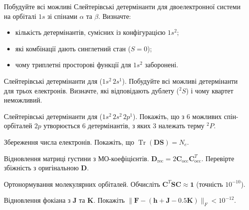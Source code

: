\begin{tasks}

    \item Побудуйте всі можливі Слейтерівські детермінанти для двоелектронної системи на орбіталі $1s$ зі спінами $\alpha$ та $\beta$.
    Визначте:
    \begin{itemize}[leftmargin=*]
        \item кількість детермінантів, сумісних із конфігурацією $1s^2$;
        \item які комбінації дають синглетний стан ($S=0$);
        \item чому триплетні просторові функції для $1s^2$ заборонені.
    \end{itemize}

    \item Слейтерівські детермінанти для  ($1s^2\,2s^1$).
    Побудуйте всі можливі детермінанти для трьох електронів.
    Визначте, які відповідають дублету ($^{2}\!S$) і чому квартет неможливий.

    \item Слейтерівські детермінанти для  ($1s^2\,2s^2\,2p^1$).
    Покажіть, що з $6$ можливих спін-орбіталей $2p$ утворюється $6$ детермінантів, з яких $3$ належать терму $^{2}\!P$.


    \item Збереження числа електронів.
    Покажіть, що $\operatorname{Tr}(\mathbf{D} \mathbf{S}) = N_e$.

    \item Відновлення матриці густини з МО-коефіцієнтів.
    $\mathbf{D}_{\text{rec}} = 2 \mathbf{C}_{\text{occ}} \mathbf{C}_{\text{occ}}^T$. Перевірте збіжність з оригінальною $\mathbf{D}$.

    \item Ортонормування молекулярних орбіталей.
    Обчисліть $\mathbf{C}^T \mathbf{S} \mathbf{C} \approx \mathbf{1}$ (точність $10^{-10}$).

    \item Відновлення фокіана з $\mathbf{J}$ та $\mathbf{K}$.
    Покажіть $\|\mathbf{F} - (\mathbf{h} + \mathbf{J} - 0.5\mathbf{K})\|_F < 10^{-12}$.


\end{tasks}
